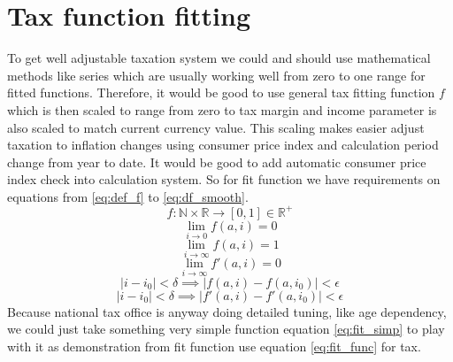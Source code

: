 \section{Tax function fitting}
\label{tax_function_fitting}
To get well adjustable taxation system we could and should use mathematical methods like series
which are usually working well from zero to one range for fitted functions.
Therefore, it would be good to use general tax fitting function $f$
which is then scaled to range from zero to tax margin
and income parameter is also scaled to match current currency value.
This scaling makes easier adjust taxation to inflation changes using consumer price index
and calculation period change from year to date.
It would be good to add automatic consumer price index check into calculation system.
So for fit function we have requirements on equations from \ref{eq:def_f} to \ref{eq:df_smooth}.
\begin{equation} \label{eq:def_f}
 f:\mathbb{N}\times\mathbb{R} \rightarrow [0,1]\in\mathbb{R}^+
\end{equation}
\begin{equation} \label{eq:f_min}
 \lim_{i \to 0} f(a,i) = 0
\end{equation}
\begin{equation} \label{eq:f_max}
 \lim_{i \to \infty} f(a,i) = 1
\end{equation}
\begin{equation} \label{eq:df_min}
 \lim_{i \to \infty} f'(a,i)=0
\end{equation}
\begin{equation} \label{eq:f_smooth}
 |i-i_0|<\delta \implies |f(a,i)-f(a,i_0)|<\epsilon
\end{equation}
\begin{equation} \label{eq:df_smooth}
 |i-i_0|<\delta \implies |f'(a,i)-f'(a,i_0)|<\epsilon
\end{equation}
Because national tax office is anyway doing detailed tuning, like age dependency,
we could just take something very simple function equation \ref{eq:fit_simp} to play with
it as demonstration from fit function use equation \ref{eq:fit_func} for tax.
